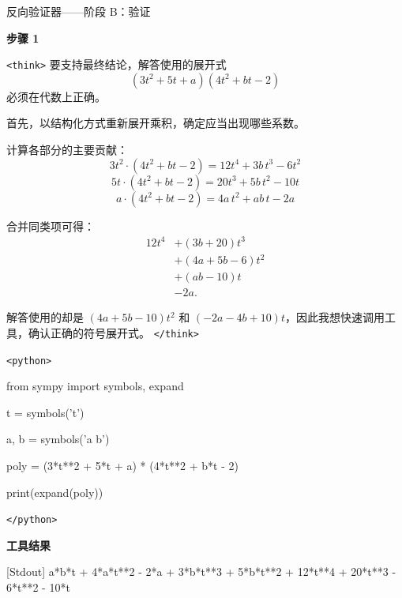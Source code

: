 \documentclass[11pt]{article}
\begin{document}
\begin{exbox}{反向验证器——阶段 B：验证}

\textbf{步骤 1}

\texttt{<think>}
要支持最终结论，解答使用的展开式
\[
(3t^2+5t+a)(4t^2+bt-2)
\]
必须在代数上正确。

首先，以结构化方式重新展开乘积，确定应当出现哪些系数。

计算各部分的主要贡献：
\[
3t^2\cdot(4t^2+bt-2)=12t^4+3b\,t^3-6t^2
\]
\[
5t\cdot(4t^2+bt-2)=20t^3+5b\,t^2-10t
\]
\[
a\cdot(4t^2+bt-2)=4a\,t^2+ab\,t-2a
\]

合并同类项可得：
\[
\begin{aligned}
12t^4
&+ (3b+20)t^3 \\
&+ (4a+5b-6)t^2 \\
&+ (ab-10)t \\
&- 2a.
\end{aligned}
\]

解答使用的却是 $(4a+5b-10)t^2$ 和 $(-2a-4b+10)t$，因此我想快速调用工具，确认正确的符号展开式。
\texttt{</think>}

\texttt{<python>}

from sympy import symbols, expand

t = symbols('t')

a, b = symbols('a b')

poly = (3*t**2 + 5*t + a) * (4*t**2 + b*t - 2)

print(expand(poly))

\texttt{</python>}

\textbf{工具结果}

[Stdout]
a*b*t + 4*a*t**2 - 2*a + 3*b*t**3 + 5*b*t**2 + 12*t**4 + 20*t**3 - 6*t**2 - 10*t

\end{exbox}
\end{document}
